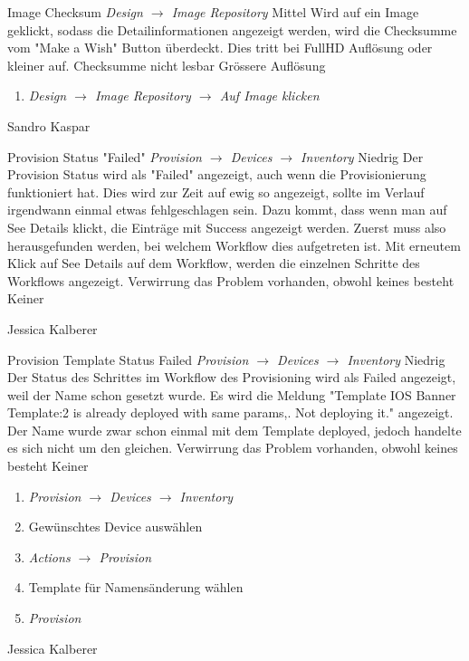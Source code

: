 \bugreport
{Image Checksum}
{\textit{Design $\rightarrow$ Image Repository}}
{Mittel}
{Wird auf ein Image geklickt, sodass die Detailinformationen angezeigt werden, wird die Checksumme vom "Make a Wish" Button überdeckt. Dies tritt bei FullHD Auflösung oder kleiner auf.
}
{Checksumme nicht lesbar}
{Grössere Auflösung}
{
	\begin{enumerate}
		\item \textit{Design $\rightarrow$ Image Repository $\rightarrow$ Auf Image klicken}
	\end{enumerate}
}
{Sandro Kaspar}
{}


\bugreport
{Provision Status "Failed"}
{\textit{ Provision $\rightarrow$ Devices $\rightarrow$ Inventory}}
{Niedrig}
{Der Provision Status wird als "Failed" angezeigt, auch wenn die Provisionierung funktioniert hat. Dies wird zur Zeit auf ewig so angezeigt, sollte im Verlauf irgendwann einmal etwas fehlgeschlagen sein. Dazu kommt, dass wenn man auf See Details klickt, die Einträge mit Success angezeigt werden. Zuerst muss also herausgefunden werden, bei welchem Workflow dies aufgetreten ist. Mit erneutem Klick auf See Details auf dem Workflow, werden die einzelnen Schritte des Workflows angezeigt.
}
{Verwirrung das Problem vorhanden, obwohl keines besteht}
{Keiner}
{
	
}
{Jessica Kalberer}
{}


\bugreport
{Provision Template Status Failed}
{\textit{ Provision $\rightarrow$ Devices $\rightarrow$ Inventory}}
{Niedrig}
{Der Status des Schrittes im Workflow des Provisioning wird als Failed angezeigt, weil der Name schon gesetzt wurde. Es wird die Meldung "Template IOS Banner Template:2 is already deployed with same params,. Not deploying it." angezeigt. Der Name wurde zwar schon einmal mit dem Template deployed, jedoch handelte es sich nicht um den gleichen.
}
{Verwirrung das Problem vorhanden, obwohl keines besteht}
{Keiner}
{
	\begin{enumerate}
		\item \textit{Provision $\rightarrow$ Devices $\rightarrow$ Inventory}
		\item Gewünschtes Device auswählen
		\item \textit{Actions $\rightarrow$ Provision}
		\item Template für Namensänderung wählen
		\item \textit{Provision}
	\end{enumerate}
}
{Jessica Kalberer}
{}

